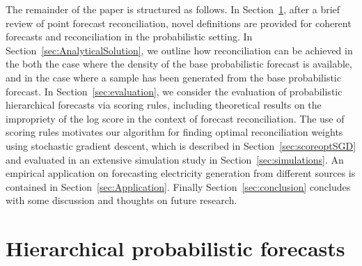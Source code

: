 \documentclass[11pt]{article}
\theoremstyle{definition}
\begin{document}


The remainder of the paper is structured as follows. In Section~\ref{sec:ProbForecasts}, after a brief review of point forecast reconciliation, novel definitions are provided for coherent forecasts and reconciliation in the probabilistic setting. In Section~\ref{sec:AnalyticalSolution}, we outline how reconciliation can be achieved in the both the case where the density of the base probabilistic forecast is available, and in the case where a sample has been generated from the base probabilistic forecast. In Section~\ref{sec:evaluation}, we consider the evaluation of probabilistic hierarchical forecasts via scoring rules, including theoretical results on the impropriety of the log score in the context of forecast reconciliation. The use of scoring rules motivates our algorithm for finding optimal reconciliation weights using stochastic gradient descent, which is described in Section~\ref{sec:scoreoptSGD} and evaluated in an extensive simulation study in Section~\ref{sec:simulations}. An empirical application on forecasting electricity generation from different sources is contained in Section~\ref{sec:Application}. Finally Section~\ref{sec:conclusion} concludes with some discussion and thoughts on future research.

\section{Hierarchical probabilistic forecasts}\label{sec:ProbForecasts}
\end{document}
